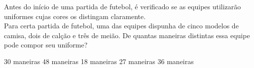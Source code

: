 Antes do início de uma partida de futebol, é verificado se as equipes utilizarão uniformes cujas cores os distingam claramente.\\Para certa partida de futebol, uma das equipes dispunha de cinco modelos de camisa, dois de calção e três de meião. De quantas maneiras distintas essa equipe pode compor seu uniforme?

30 maneiras
48 maneiras
18 maneiras
27 maneiras
36 maneiras



